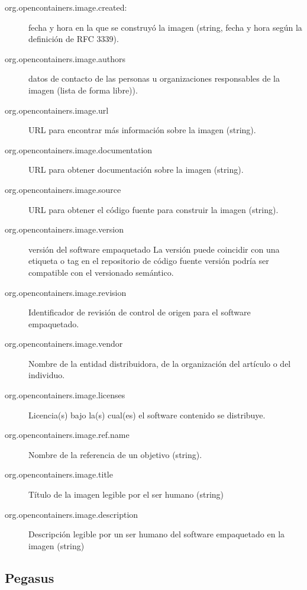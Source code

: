 \begin{description}
   \item[org.opencontainers.image.created:] fecha y hora en la que se construyó la imagen (string, fecha y hora según la definición de RFC 3339).
    \item [org.opencontainers.image.authors] datos de contacto de las personas u organizaciones responsables de la imagen (lista de forma libre)).
    \item [org.opencontainers.image.url] URL para encontrar más información sobre la imagen (string).
    \item [org.opencontainers.image.documentation] URL para obtener documentación sobre la imagen (string).
    \item [org.opencontainers.image.source] URL para obtener el código fuente para construir la imagen (string).
    \item [org.opencontainers.image.version] versión del software empaquetado
        La versión puede coincidir con una etiqueta o tag en el repositorio de código fuente versión podría ser compatible con el versionado semántico.
    \item [org.opencontainers.image.revision] Identificador de revisión de control de origen para el software empaquetado.
    \item [org.opencontainers.image.vendor] Nombre de la entidad distribuidora, de la organización del artículo o del individuo.
    \item [org.opencontainers.image.licenses] Licencia(s) bajo la(s) cual(es) el software contenido se distribuye.
    \item [org.opencontainers.image.ref.name] Nombre de la referencia de un objetivo (string).  
    \item [org.opencontainers.image.title] Título de la imagen legible por el ser humano (string)
    \item [org.opencontainers.image.description] Descripción legible por un ser humano del software empaquetado en la imagen (string)
\end{description}


\subsection{Pegasus}

